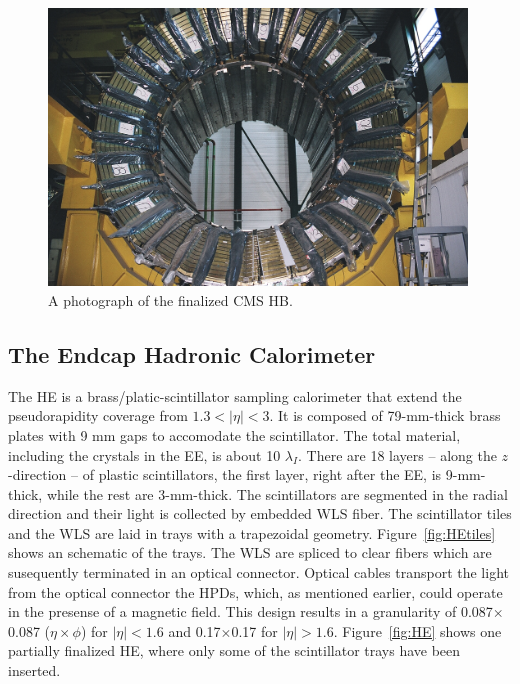 \begin{figure}
 \centering
\includegraphics[width=0.99\textwidth]{CMS_DetectorFigures/hcal-HB.jpg}
\caption{A photograph of the finalized CMS HB.\label{fig:hcal}}
\end{figure}
\subsection{The Endcap Hadronic Calorimeter}
The HE is a brass/platic-scintillator sampling calorimeter that extend
the pseudorapidity coverage from $1.3 < |\eta| < 3$. It is composed of
79-mm-thick brass plates with 9 mm gaps to accomodate the
scintillator. The total material, including the crystals in the EE, is
about 10 $\lambda_{I}$. There are 18 layers -- along the $z$-direction
-- of plastic scintillators, the first layer, right after the EE, is
9-mm-thick, while the rest are 3-mm-thick. The scintillators are
segmented in the radial direction and their light is collected by
embedded WLS fiber. The scintillator tiles and the WLS are laid in
trays with a trapezoidal geometry. Figure~\ref{fig:HEtiles} shows an
schematic of the trays. The WLS are spliced to clear fibers which are
susequently terminated in an optical connector. Optical cables
transport the light from the optical connector the HPDs, which, as
mentioned earlier, could operate in the presense of a magnetic
field. This design results in a granularity of 0.087$\times$0.087
($\eta\times\phi$) for $|\eta| < 1.6$ and 0.17$\times$0.17 for $|\eta|
> 1.6$. Figure~\ref{fig:HE} shows one partially finalized HE, where
only some of the scintillator trays have been inserted.

